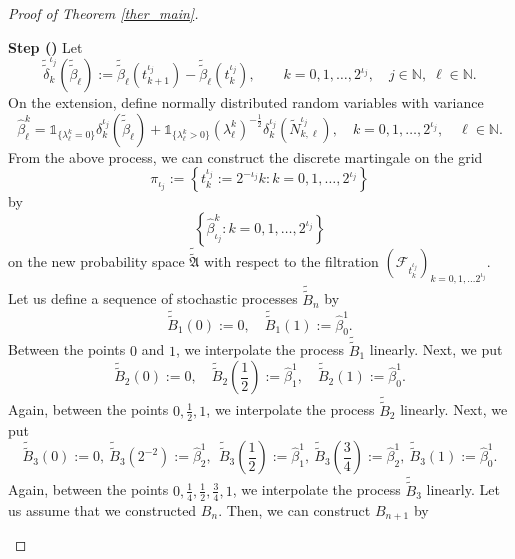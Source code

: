 \documentclass[english,a4paper,11pt]{amsart}
\theoremstyle{plain}
\theoremstyle{definition}
\theoremstyle{remark}
\numberwithin{equation}{section}
\newcounter{lil1}
\newenvironment{step}
{\begin{list} { \bf Step (\Roman{lil1})}
		{ \usecounter{lil1}
			\setlength{\leftmargin}{0.0cm}
			\setlength{\topsep}{0.2cm}
			\setlength{\itemsep}{0.0cm}
			\setlength{\parsep}{0.1cm}
			\setlength{\itemindent}{0.8cm}
			\setlength{\parskip}{0.0cm}}}
	{\end{list}}
\newcounter{lil33}
\newcounter{lil1q}
\newcommand{\wi}[1]{{\widetilde{#1}}}
\def\wi{\widetilde}
\newcommand{\lk}{\left}
\newcommand{\rk}{\right}
\newcommand{\CF}{{{ \mathcal F }}}
\begin{document}
\begin{proof}[Proof of Theorem \ref{ther_main}]
\begin{step}
Let 
	$$
\widetilde{\widetilde{\delta}}^{\iota_j}_{k}(\widetilde{\widetilde{\beta}}_{\ell})
:= 
\widetilde{\widetilde{\beta}}_{\ell}(t_{k+1}^{\iota_j})
-
\widetilde{\widetilde{\beta}}_{\ell}(t_{k}^{\iota_j}),
\qquad 
k=0,1,\ldots,2^{\iota_j},\quad j\in\mathbb{N},\; \ell\in\mathbb{N}.
	$$
	On the extension, define normally distributed random variables with variance 
	\begin{equation*}
		\widehat{\beta}_{\ell}^k =\mathds{1}_{\{\lambda_{\ell}^k=0\} }
		\delta _k^{{\iota_j}} ( \wi{\widetilde{\beta}}_\ell) +\mathds{1}_{\{\lambda_{\ell}^k>0\} }
		(\lambda_{\ell}^k)^{-\frac 12 } \delta_k^{{\iota_j}}(\wi{N}^{{\iota_j}} _{k,\ell}), \quad k=0,1,\ldots , 2^{{\iota_j}},\quad \ell \in \mathbb{N}. \label{8.11}
	\end{equation*}
	From the above process, we can construct the discrete martingale
	on the grid 
	$$\pi_{{\iota_j}}:=\lk\{t_k^{{\iota_j}}:=2^{-{{\iota_j}}}k:k=0,1,\ldots,2^{{\iota_j}} \rk\}$$
	by
	$$
	\lk\{ \widehat{\beta}_{{\iota_j}}^k :k=0,1,\ldots,2^{{\iota_j}}
	\rk\}
	$$
	on  the new probability space $\wi{\widetilde{\mathfrak{A}}}$
	with respect to the filtration $(\CF_{t_k^{{\iota_j}}})_{k=0,1,\dots 2^{{\iota_j}}}$.
	Let us define a sequence of stochastic processes $\widetilde{\widetilde{B}}_n$ 
	by
	$$
	\widetilde{\widetilde{B}}_1(0):=	0,\quad \widetilde{\widetilde{B}}_1(1):=\widehat{\beta}_0^1.
	$$
	Between the points $0$ and $1$, we interpolate the process ${\widetilde{\widetilde{B}}}_1$  linearly.
	Next, we put
	 $$	{\widetilde{\widetilde{B}}}_2(0):=	0,
	 \quad \widetilde{\widetilde{B}}_2(\frac 12 ):=\widehat{\beta}^1_1,\quad  \widetilde{\widetilde{B}}_2(1):=\widehat{\beta}_0^1.
	 $$
	 Again, between the points $0,\frac 12,1$, we  interpolate the process $\widetilde{\widetilde{B}}_2$  linearly.
	 Next, we put
	 $$	\widetilde{\widetilde{B}}_3(0):=	0, \  \widetilde{\widetilde{B}}_3(2^{-2}):=\widehat{\beta}^1_2,\ 
\ \widetilde{\widetilde{B}}_3(\frac 12 ):=\widehat{\beta}^1_1,\  \widetilde{\widetilde{B}}_3(\frac{3}{4}):=\widehat{\beta}^1_2,\ \widetilde{\widetilde{B}}_3(1):=\widehat{\beta}_0^1.
$$
	 Again, between the points $0,\frac 14,\frac 12,\frac 34,1$, we  interpolate the process $\widetilde{\widetilde{B}}_3$  linearly. 
	 Let us assume that we constructed $B_n$. Then, we can construct $B_{n+1}$ by 
	 

\end{step}
\end{proof}
\end{document}
